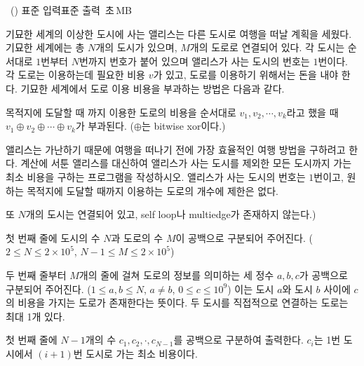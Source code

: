 \begin{problem}{\kcpcprobtrip\ (\kcpcprobtripshort)}
    {표준 입력}{표준 출력}
    {\kcpcprobtriptime\,초}{\kcpcprobtripmemory\,MB}{}
    
    기묘한 세계의 이상한 도시에 사는 앨리스는 다른 도시로 여행을 떠날 계획을 세웠다. 기묘한 세계에는 총 $N$개의 도시가 있으며, $M$개의 도로로 연결되어 있다. 각 도시는 순서대로 $1$번부터 $N$번까지 번호가 붙어 있으며 앨리스가 사는 도시의 번호는 $1$번이다. 각 도로는 이용하는데 필요한 비용 $v$가 있고, 도로를 이용하기 위해서는 돈을 내야 한다. 기묘한 세계에서 도로 이용 비용을 부과하는 방법은 다음과 같다.
    
    목적지에 도달할 때 까지 이용한 도로의 비용을 순서대로 $v_{1}, v_{2}, \cdots, v_{k}$라고 했을 때 $v_{1} \oplus v_{2} \oplus \cdots \oplus v_{k}$가 부과된다. ($\oplus$는 bitwise xor이다.)
    
    앨리스는 가난하기 때문에 여행을 떠나기 전에 가장 효율적인 여행 방법을 구하려고 한다. 계산에 서툰 앨리스를 대신하여 앨리스가 사는 도시를 제외한 모든 도시까지 가는 최소 비용을 구하는 프로그램을 작성하시오. 앨리스가 사는 도시의 번호는 $1$번이고, 원하는 목적지에 도달할 때까지 이용하는 도로의 개수에 제한은 없다.
    
    또 $N$개의 도시는 연결되어 있고, self loop나 multiedge가 존재하지 않는다.)
    
    
    \InputFile
    첫 번째 줄에 도시의 수 $N$과 도로의 수 $M$이 공백으로 구분되어 주어진다. ($2 \le N \le 2 \times 10^5$, $N-1 \le M \le 2 \times 10^5$)
    
    두 번째 줄부터 $M$개의 줄에 걸쳐 도로의 정보를 의미하는 세 정수 $a, b, c$가 공백으로 구분되어 주어진다. ($1 \le a, b \le N$, $a \neq b$, $0 \le c \le 10^9$)
    이는 도시 $a$와 도시 $b$ 사이에 $c$의 비용을 가지는 도로가 존재한다는 뜻이다. 두 도시를 직접적으로 연결하는 도로는 최대 1개 있다.
    
    \OutputFile
    첫 번째 줄에 $N-1$개의 수 $c_1, c_2, \cdot, c_{N-1}$를 공백으로 구분하여 출력한다. $c_i$는 1번 도시에서  $(i+1)$번 도시로 가는 최소 비용이다.
    
    \Examples
    \begin{example}
    \end{example}
    
\end{problem}

